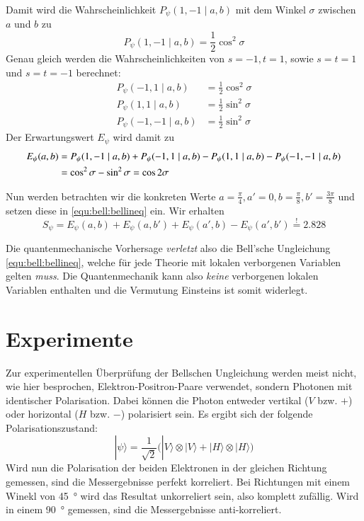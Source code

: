 \begin{refsection}
Damit wird die Wahrscheinlichkeit $P_{\psi}(1,-1 \mid a,b)$ mit dem Winkel
$\sigma$ zwischen $a$ und $b$ zu
\begin{equation}
    P_{\psi}(1,-1 \mid a,b) = \frac{1}{2} \cos^2\sigma
\end{equation}
Genau gleich werden die Wahrscheinlichkeiten von $s=-1,t=1$, sowie
$s=t=1$ und $s=t=-1$ berechnet:
\begin{align}
    P_{\psi}(-1,1 \mid a,b) &= \frac{1}{2} \cos^2\sigma \\
    P_{\psi}(1,1 \mid a,b) &= \frac{1}{2} \sin^2\sigma \\
    P_{\psi}(-1,-1 \mid a,b) &= \frac{1}{2} \sin^2\sigma
\end{align}
Der Erwartungswert $E_{\psi}$ wird damit zu
\begin{align}
    E_{\psi}(a,b) &= P_{\psi}(1,-1 \mid a,b) + P_{\psi}(-1,1 \mid a,b) -
        P_{\psi}(1,1 \mid a,b) - P_{\psi}(-1,-1 \mid a,b)  \notag \\
    &= \cos^2\sigma - \sin^2\sigma  = \cos 2\sigma
\end{align}

Nun werden betrachten wir die konkreten Werte 
$a=\frac{\pi}{4}, a'=0, b=\frac{\pi}{8}, b' = \frac{3\pi}{8}$ 
und setzen diese in \eqref{equ:bell:bellineq} ein. Wir erhalten
\begin{equation}
    S_{\psi} = E_{\psi}(a,b) + E_{\psi}(a,b') + E_{\psi}(a',b) - E_{\psi}(a',b') \stackrel{!}{=} 2.828
    \label{equ:bell:bellineq_beweis}
\end{equation}

Die quantenmechanische Vorhersage \emph{verletzt} also die Bell'sche 
Ungleichung \eqref{equ:bell:bellineq}, welche f\"ur jede Theorie mit lokalen
verborgenen Variablen gelten \emph{muss}.
Die Quantenmechanik kann also \emph{keine} verborgenen lokalen Variablen
enthalten und die Vermutung Einsteins ist somit widerlegt.

\section{Experimente}

Zur experimentellen \"Uberpr\"ufung der Bellschen Ungleichung werden meist
nicht, wie hier besprochen, Elektron-Positron-Paare verwendet, sondern
Photonen mit identischer Polarisation.
Dabei k\"onnen die Photon entweder vertikal ($V$ bzw. $+$) oder horizontal
($H$ bzw. $-$) polarisiert sein. 
Es ergibt sich der folgende Polarisationszustand:
\begin{equation}\label{equ:bell:photonstate}
    |\psi\rangle = \frac{1}{\sqrt{2}} \Big(
        |V\rangle \otimes |V\rangle + |H\rangle \otimes |H\rangle
    \Big)
\end{equation}
Wird nun die Polarisation der beiden Elektronen in der gleichen Richtung 
gemessen, sind die Messergebnisse perfekt korreliert.
Bei Richtungen mit einem Winekl von \SI{45}{\degree} wird das Resultat
unkorreliert sein, also komplett zuf\"allig.
Wird in einem \SI{90}{\degree} gemessen, sind die Messergebnisse
anti-korreliert.


\end{refsection}
